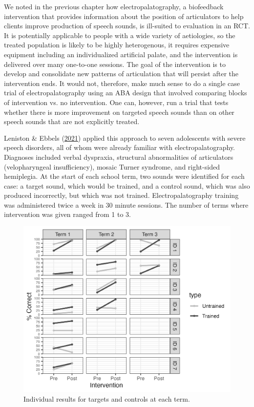 \documentclass{krantz}
\begin{document}
We noted in the previous chapter how electropalatography, a biofeedback intervention that provides information about the position of articulators to help clients improve production of speech sounds, is ill-suited to evaluation in an RCT. It is potentially applicable to people with a wide variety of aetiologies, so the treated population is likely to be highly heterogenous, it requires expensive equipment including an individualized artificial palate, and the intervention is delivered over many one-to-one sessions. The goal of the intervention is to develop and consolidate new patterns of articulation that will persist after the intervention ends. It would not, therefore, make much sense to do a single case trial of electropalatography using an ABA design that involved comparing blocks of intervention vs. no intervention. One can, however, run a trial that tests whether there is more improvement on targeted speech sounds than on other speech sounds that are not explicitly treated.

Leniston \& Ebbels (\protect\hyperlink{ref-leniston2021}{2021}) applied this approach to seven adolescents with severe speech disorders, all of whom were already familiar with electropalatography. Diagnoses included verbal dyspraxia, structural abnormalities of articulators (velopharyngeal insufficiency), mosaic Turner syndrome, and right-sided hemiplegia. At the start of each school term, two sounds were identified for each case: a target sound, which would be trained, and a control sound, which was also produced incorrectly, but which was not trained. Electropalatography training was administered twice a week in 30 minute sessions. The number of terms where intervention was given ranged from 1 to 3.

\begin{figure}
\includegraphics[width=0.9\linewidth]{images_bw/Ebbels} \caption{Individual results for targets and controls at each term.}\label{fig:ebbelsfig}
\end{figure}
\end{document}
